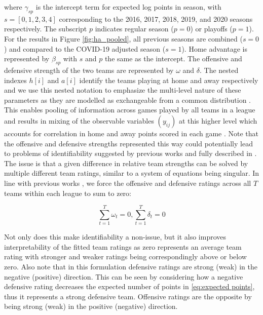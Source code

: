 where \(\gamma_{sp}\) is the intercept term for expected log points in season, with \(s = [0, 1, 2, 3, 4]\) corresponding to the 2016, 2017, 2018, 2019, and 2020 seasons respectively. The subscript \(p\) indicates regular season (\(p=0\)) or playoffs (\(p=1\)). For the results in Figure \ref{fig:ha_pooled}, all previous seasons are combined (\(s=0\)) and compared to the COVID-19 adjusted season (\(s=1\)). Home advantage is represented by \(\beta_{sp}\) with \(s\) and \(p\) the same as the intercept. The offensive and defensive strength of the two teams are represented by \(\omega\) and \(\delta\). The nested indexes \(h[i]\) and \(a[i]\) identify the teams playing at home and away respectively and we use this nested notation to emphasize the multi-level nature of these parameters as they are modelled as exchangeable from a common distribution \cite{McElreath2020} \cite{Gelman2014} \cite{Gelman2006}. This enables pooling of information across games played by all teams in a league and results in mixing of the observable variables \((y_{ij})\) at this higher level which accounts for correlation in home and away points scored in each game \cite{Baio2010}. Note that the offensive and defensive strengths represented this way could potentially lead to problems of identifiability suggested by previous works \cite{Baio2010} \cite{Benz2020} \cite{Karlis2003} and fully described in \cite{McElreath2020}. The issue is that a given difference in relative team strengths can be solved by multiple different team ratings, similar to a system of equations being singular. In line with previous works \cite{Baio2010} \cite{Benz2020} \cite{Karlis2003}, we force the offensive and defensive ratings across all $T$ teams within each league to sum to zero:

\begin{equation} \label{eq:sum to zero}
\sum_{t=1}^{T} \omega_t = 0, \sum_{t=1}^{T} \delta_t = 0
\end{equation}

Not only does this make identifiability a non-issue, but it also improves interpretability of the fitted team ratings as zero represents an average team rating with stronger and weaker ratings being correspondingly above or below zero. Also note that in this formulation defensive ratings are strong (weak) in the negative (positive) direction. This can be seen by considering how a negative defensive rating decreases the expected number of points in \ref{eq:expected points}, thus it represents a strong defensive team. Offensive ratings are the opposite by being strong (weak) in the positive (negative) direction.

